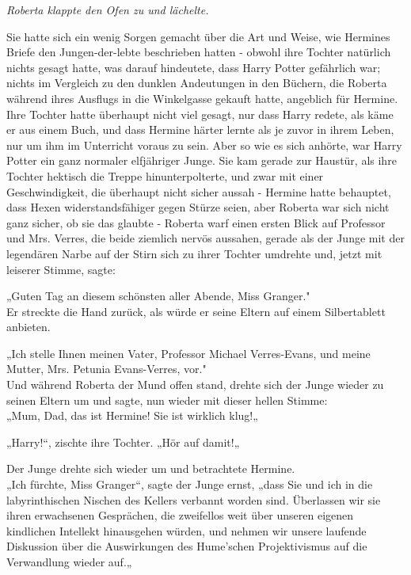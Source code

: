 {\emph{Roberta klappte den Ofen zu und lächelte.}

Sie hatte sich ein wenig Sorgen gemacht über die Art und Weise, wie Hermines Briefe den Jungen-der-lebte beschrieben hatten - obwohl ihre Tochter natürlich nichts gesagt hatte, was darauf hindeutete, dass Harry Potter gefährlich war; nichts im Vergleich zu den dunklen Andeutungen in den Büchern, die Roberta während ihres Ausflugs in die Winkelgasse gekauft hatte, angeblich für Hermine. Ihre Tochter hatte überhaupt nicht viel gesagt, nur dass Harry redete, als käme er aus einem Buch, und dass Hermine härter lernte als je zuvor in ihrem Leben, nur um ihm im Unterricht voraus zu sein. Aber so wie es sich anhörte, war Harry Potter ein ganz normaler elfjähriger Junge. Sie kam gerade zur Haustür, als ihre Tochter hektisch die Treppe hinunterpolterte, und zwar mit einer Geschwindigkeit, die überhaupt nicht sicher aussah - Hermine hatte behauptet, dass Hexen widerstandsfähiger gegen Stürze seien, aber Roberta war sich nicht ganz sicher, ob sie das glaubte - Roberta warf einen ersten Blick auf Professor und Mrs. Verres, die beide ziemlich nervös aussahen, gerade als der Junge mit der legendären Narbe auf der Stirn sich zu ihrer Tochter umdrehte und, jetzt mit leiserer Stimme, sagte:

„Guten Tag an diesem schönsten aller Abende, Miss Granger."\\ Er streckte die Hand zurück, als würde er seine Eltern auf einem Silbertablett anbieten.

„Ich stelle Ihnen meinen Vater, Professor Michael Verres-Evans, und meine Mutter, Mrs. Petunia Evans-Verres, vor."\\ Und während Roberta der Mund offen stand, drehte sich der Junge wieder zu seinen Eltern um und sagte, nun wieder mit dieser hellen Stimme:\\ „Mum, Dad, das ist Hermine! Sie ist wirklich klug!„

„Harry!“, zischte ihre Tochter. „Hör auf damit!„

Der Junge drehte sich wieder um und betrachtete Hermine.\\ „Ich fürchte, Miss Granger“, sagte der Junge ernst, „dass Sie und ich in die labyrinthischen Nischen des Kellers verbannt worden sind. Überlassen wir sie ihren erwachsenen Gesprächen, die zweifellos weit über unseren eigenen kindlichen Intellekt hinausgehen würden, und nehmen wir unsere laufende Diskussion über die Auswirkungen des Hume'schen Projektivismus auf die Verwandlung wieder auf.„

}
